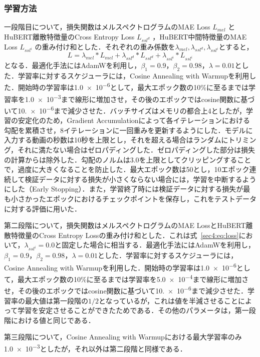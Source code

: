 \documentclass[12pt]{jarticle}
\numberwithin{equation}{section}    %
\numberwithin{figure}{section}      %
\numberwithin{table}{section}      %
\begin{document}
\subsubsection{学習方法}
一段階目について，損失関数はメルスペクトログラムのMAE Loss $L_{mel}$ とHuBERT離散特徴量のCross Entropy Loss $L_{ssl^{d}}$ ，HuBERT中間特徴量のMAE Loss $L_{ssl^{i}}$ の重み付け和とした．それぞれの重み係数を$\lambda_{mel}, \lambda_{ssl^{d}}, \lambda_{ssl^{i}}$とすると，
\begin{equation}
    \label{sec4:eq:loss}
    L = \lambda_{mel} * L_{mel} + \lambda_{ssl^{d}} * L_{ssl^{d}} + \lambda_{ssl^{i}} * L_{ssl^{i}}
\end{equation}
となる．最適化手法にはAdamW\cite{loshchilov2017decoupled}を利用し，$\beta_{1} = 0.9$，$\beta_{2} = 0.98$，$\lambda = 0.01$とした．学習率に対するスケジューラには，Cosine Annealing with Warmupを利用した．開始時の学習率は\num{1.0e-6}として，最大エポック数の10\%に至るまでは学習率を\num{1.0e-3}まで線形に増加させ，その後のエポックではcosine関数に基づいて\num{10.e-6}まで減少させた．バッチサイズはメモリの都合上4としたが，学習の安定化のため，Gradient Accumulationによって各イテレーションにおける勾配を累積させ，8イテレーションに一回重みを更新するようにした．モデルに入力する動画の秒数は10秒を上限とし，それを超える場合はランダムにトリミング，それに満たない場合はゼロパディングした．ゼロパディングした部分は損失の計算からは除外した．勾配のノルムは3.0を上限としてクリッピングすることで，過度に大きくなることを防止した．最大エポック数は50とし，10エポック連続して検証データに対する損失が小さくならない場合には，学習を中断するようにした（Early Stopping）．また，学習終了時には検証データに対する損失が最も小さかったエポックにおけるチェックポイントを保存し，これをテストデータに対する評価に用いた．

第二段階について，損失関数はメルスペクトログラムのMAE LossとHuBERT離散特徴量のCross Entropy Lossの重み付け和とした．これは式~\eqref{sec4:eq:loss}において，$\lambda_{ssl^{i}} = 0.0$と固定した場合に相当する．最適化手法にはAdamWを利用し，$\beta_{1} = 0.9$，$\beta_{2} = 0.98$，$\lambda = 0.01$とした．学習率に対するスケジューラには，Cosine Annealing with Warmupを利用した．開始時の学習率は\num{1.0e-6}として，最大エポック数の10\%に至るまでは学習率を\num{5.0e-4}まで線形に増加させ，その後のエポックではcosine関数に基づいて\num{10.e-6}まで減少させた．学習率の最大値は第一段階の$1/2$となっているが，これは値を半減させることによって学習を安定させることができたためである．その他のパラメータは，第一段階における値と同じである．

第三段階について，Cosine Annealing with Warmupにおける最大学習率のみ\num{1.0e-3}としたが，それ以外は第二段階と同様である．
\end{document}
